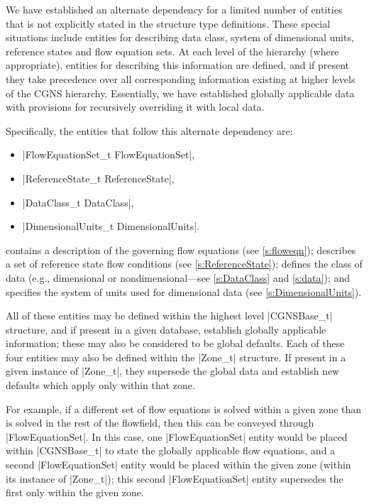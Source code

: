 We have established an alternate dependency for a limited number
of entities that is not explicitly stated in the structure type
definitions.  These special situations include entities for describing
data class, system of dimensional units, reference states and flow
equation sets.  At each level of the hierarchy (where appropriate),
entities for describing this information are defined, and if present
they take precedence over all corresponding information existing at
higher levels of the CGNS hierarchy.  Essentially, we have established
globally applicable data with provisions for recursively overriding it
with local data.

Specifically, the entities that follow this alternate dependency are:
\begin{itemize}
\item |FlowEquationSet_t FlowEquationSet|,
\item |ReferenceState_t ReferenceState|,
\item |DataClass_t DataClass|,
\item |DimensionalUnits_t DimensionalUnits|.
\end{itemize}
 contains a description of the governing flow
equations (see \autoref{s:floweqn});  describes a
set of reference state flow conditions (see \autoref{s:ReferenceState});
 defines the class of data (e.g., dimensional or
nondimensional---see \autoref{s:DataClass} and \autoref{s:data}); and
 specifies the system of units used for
dimensional data (see \autoref{s:DimensionalUnits}).

All of these entities may be defined within the highest level |CGNSBase_t|
structure, and if present in a given database, establish globally applicable
information; these may also be considered to be global defaults.  Each of
these four entities may also be defined within the |Zone_t| structure.  If
present in a given instance of |Zone_t|, they supersede the global data and
establish new defaults which apply only within that zone.

For example, if a different set of flow equations is solved within a
given zone than is solved in the rest of the flowfield, then this can be
conveyed through |FlowEquationSet|.
In this case, one |FlowEquationSet| entity would be placed within
|CGNSBase_t| to state the globally applicable flow equations, and a second
|FlowEquationSet| entity would be placed within the given zone (within its
instance of |Zone_t|); this second |FlowEquationSet| entity supersedes the
first only within the given zone.

